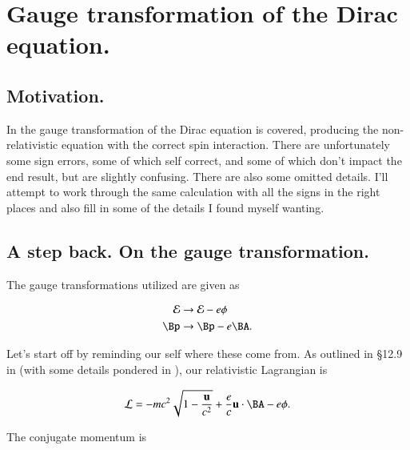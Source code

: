 %
%

\newcommand{\pslash}[0]{\cancel{p}}

\chapter{Gauge transformation of the Dirac equation.}
\label{chap:diracGauge}
{}
\date{Aug 4, 2011}

\beginArtWithToc

\section{Motivation.}

In \cite{desai2009quantum} the gauge transformation of the Dirac equation is covered, producing the non-relativistic equation with the correct spin interaction.  There are unfortunately some sign errors, some of which self correct, and some of which don't impact the end result, but are slightly confusing.  There are also some omitted details.  I'll attempt to work through the same calculation with all the signs in the right places and also fill in some of the details I found myself wanting.

\section{A step back.  On the gauge transformation.}

The gauge transformations utilized are given as

\begin{align}\label{eqn:diracGauge:10}
\mathcal{E} &\rightarrow \mathcal{E} - e \phi \\
\Bp &\rightarrow \Bp - e \BA.
\end{align}

Let's start off by reminding our self where these come from.  As outlined in \S 12.9 in \cite{jackson1975cew} (with some details pondered in \cite{miscphysics:hamiltonian}), our relativistic Lagrangian is

\begin{equation}\label{eqn:diracGauge:30}
\LL = -m c^2 \sqrt{ 1 - \frac{\Bu}{c^2}} + \frac{e}{c} \Bu \cdot \BA - e \phi.
\end{equation}

The conjugate momentum is

